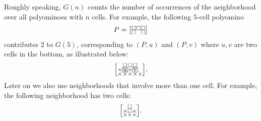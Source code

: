 \documentclass[a4paper,12pt]{article}
\makeatletter
\newcommand{\mybox}[1]{%
  \begingroup
  \setlength{\fboxsep}{1pt}%
  \fbox{\small #1}%
  \endgroup
}
\newenvironment{grid}
  {\begingroup\footnotesize
   \renewcommand{\arraystretch}{0}
   \setlength{\arraycolsep}{0pt}
   \left[\begin{array}{@{}*{10}{c}@{}}}
  {\end{array}\right]\endgroup}
\newcommand{\void}{\phantom{\times}}
\makeatother
\begin{document}
Roughly speaking, $G(n)$ counts the number of occurrences of the neighborhood over all polyominoes with $n$ cells.
For example, the following $5$-cell polyomino
\[
P = \begin{grid}
    \square & \square & \square \\
    \square & \void & \square
\end{grid}
\]
contributes $2$ to $G(5)$, corresponding to $(P,u)$ and $(P,v)$ where $u,v$ are two cells in the bottom, as illustrated below:
\[
\begin{grid}
    \void & \square & \square & \square & \void \\
    \times & \mybox{u} & \times & \mybox{v} & \void \\
    \times & \times & \times & \times & \times
\end{grid}.
\]
Later on we also use neighborhoods that involve more than one cell. For example, the following neighborhood has two cells:
\[
    \begin{grid}
        \void & \square & \void \\
        \times & \square & \times \\
        \times & \times & \times
    \end{grid}.
\]
\end{document}
